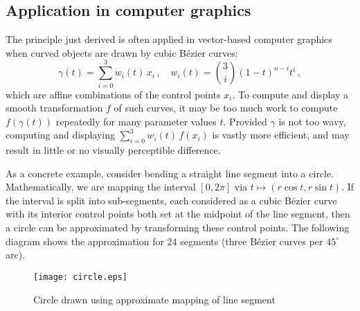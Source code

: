 \documentclass[12pt]{article}
\begin{document}
\subsection*{Application in computer graphics}

The principle just derived is often applied in vector-based computer graphics
when curved objects are drawn by cubic B\'ezier curves:
\[
\gamma(t) = \sum_{i=0}^3 w_i(t) \, x_i\,, \quad w_i(t) = \binom{3}{i} (1-t)^{n-i} t^i\,,
\]
which are affine combinations of the control points $x_i$.
To compute and display a smooth transformation $f$ of such curves,
it may be too much work to compute $f(\gamma(t))$ repeatedly
for many parameter values $t$.
Provided $\gamma$ is not too wavy,
computing and displaying $\sum_{i=0}^3 w_i(t) \, f(x_i)$
is vastly more efficient, and may result in little or 
no visually perceptible difference.

As a concrete example, consider bending a straight line segment
into a circle.
Mathematically, we are mapping the interval $[0,2\pi]$
via $t \mapsto (r\cos t, r\sin t)$.
If the interval is split into sub-segments,
each considered as a 
cubic B\'ezier curve with its interior control points
both set at the midpoint of the line segment,
then a circle can be approximated
by transforming these control points.
The following diagram shows the approximation for 24 segments (three B\'ezier
curves per $45^\circ$ arc). 

\begin{figure}[!htb]
\begin{center}
\texttt{[image: circle.eps]}
\end{center}
\caption{Circle drawn using approximate mapping of line segment}
\end{figure}

\end{document}
